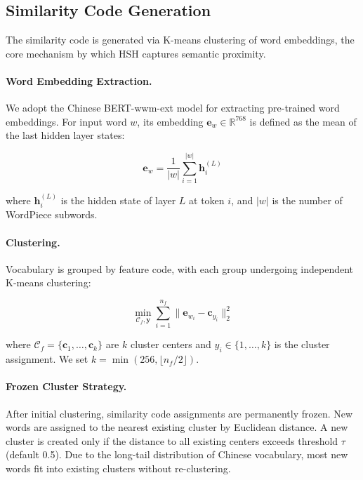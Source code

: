 \documentclass[11pt,a4paper]{article}
\theoremstyle{definition}
\begin{document}
\subsection{Similarity Code Generation}
\label{sec:sim}

The similarity code is generated via K-means clustering of word embeddings, the core mechanism by which HSH captures semantic proximity.

\paragraph{Word Embedding Extraction.} We adopt the Chinese BERT-wwm-ext model \cite{cui2020pre} for extracting pre-trained word embeddings. For input word $w$, its embedding $\mathbf{e}_w \in \mathbb{R}^{768}$ is defined as the mean of the last hidden layer states:

\begin{equation}
\mathbf{e}_w = \frac{1}{|w|} \sum_{i=1}^{|w|} \mathbf{h}_i^{(L)}
\end{equation}

where $\mathbf{h}_i^{(L)}$ is the hidden state of layer $L$ at token $i$, and $|w|$ is the number of WordPiece subwords.

\paragraph{Clustering.} Vocabulary is grouped by feature code, with each group undergoing independent K-means clustering:

\begin{equation}
\min_{\mathcal{C}_f, \mathbf{y}} \sum_{i=1}^{n_f} \|\mathbf{e}_{w_i} - \mathbf{c}_{y_i}\|_2^2
\end{equation}

where $\mathcal{C}_f = \{\mathbf{c}_1, \ldots, \mathbf{c}_k\}$ are $k$ cluster centers and $y_i \in \{1, \ldots, k\}$ is the cluster assignment. We set $k = \min(256, \lfloor n_f/2 \rfloor)$.

\paragraph{Frozen Cluster Strategy.} After initial clustering, similarity code assignments are permanently frozen. New words are assigned to the nearest existing cluster by Euclidean distance. A new cluster is created only if the distance to all existing centers exceeds threshold $\tau$ (default 0.5). Due to the long-tail distribution of Chinese vocabulary, most new words fit into existing clusters without re-clustering.
\end{document}
